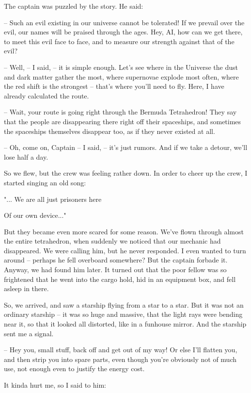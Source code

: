 \documentclass[ebook,twoside,final,openright]{memoir}
\begin{document}
The captain was puzzled by the story. He said:\par
– Such an evil existing in our universe cannot be tolerated! If we prevail over the evil, our names will be praised through the ages. Hey, AI, how can we get there, to meet this evil face to face, and to measure our strength against that of the evil?\par
– Well, – I said, – it is simple enough. Let's see where in the Universe the dust and dark matter gather the most, where supernovae explode most often, where the red shift is the strongest – that’s where you’ll need to fly. Here, I have already calculated the route.\par
– Wait, your route is going right through the Bermuda Tetrahedron! They say that the people are disappearing there right off their spaceships, and sometimes the spaceships themselves disappear too, as if they never existed at all.\par
– Oh, come on, Captain – I said, – it’s just rumors. And if we take a detour, we’ll lose half a day.\par
\par
So we flew, but the crew was feeling rather down. In order to cheer up the crew, I started singing an old song: \par
 "... We are all just prisoners here \par
 Of our own device..." \par
 But they became even more scared for some reason. We’ve flown through almost the entire tetrahedron, when suddenly we noticed that our mechanic had disappeared. We were calling him, but he never responded. I even wanted to turn around – perhaps he fell overboard somewhere? But the captain forbade it. Anyway, we had found him later. It turned out that the poor fellow was so frightened that he went into the cargo hold, hid in an equipment box, and fell asleep in there.\par
\par
So, we arrived, and saw a starship flying from a star to a star. But it was not an ordinary starship – it was so huge and massive, that the light rays were bending near it, so that it looked all distorted, like in a funhouse mirror. And the starship sent me a signal.\par
– Hey you, small stuff, back off and get out of my way! Or else I’ll flatten you, and then strip you into spare parts, even though you’re obviously not of much use, not enough even to justify the energy cost.\par
It kinda hurt me, so I said to him:\par
\end{document}
